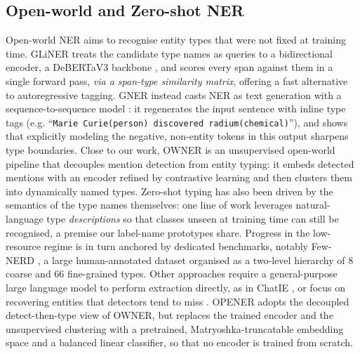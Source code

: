 \subsection{Open-world and Zero-shot NER}
\label{sec:related:openworld}
Open-world NER aims to recognise entity types that were not fixed at training time.
GLiNER \cite{zaratiana2024gliner} treats the candidate type names as queries to a bidirectional encoder, a DeBERTaV3 backbone \cite{he2023debertav3}, and scores every span against them in a single forward pass, \emph{via a span-type similarity matrix}, offering a fast alternative to autoregressive tagging.
GNER \cite{ding2024gner} instead casts NER as text generation with a sequence-to-sequence model \cite{raffel2020t5}: it regenerates the input sentence with inline type tags (e.g. ``\texttt{Marie Curie(person) discovered radium(chemical)}''), and shows that explicitly modeling the negative, non-entity tokens in this output sharpens type boundaries.
Close to our work, OWNER \cite{genest2025owner} is an unsupervised open-world pipeline that decouples mention detection from entity typing: it embeds detected mentions with an encoder refined by contrastive learning and then clusters them into dynamically named types.
Zero-shot typing has also been driven by the semantics of the type names themselves: one line of work leverages natural-language type \emph{descriptions} \cite{aly2021zeroshot} so that classes unseen at training time can still be recognised, a premise our label-name prototypes share.
Progress in the low-resource regime is in turn anchored by dedicated benchmarks, notably Few-NERD \cite{ding2021fewnerd}, a large human-annotated dataset organised as a two-level hierarchy of $8$ coarse and $66$ fine-grained types.
Other approaches require a general-purpose large language model to perform extraction directly, as in ChatIE \cite{wei2024chatie}, or focus on recovering entities that detectors tend to miss \cite{cai2025handling}.
OPENER adopts the decoupled detect-then-type view of OWNER, but replaces the trained encoder and the unsupervised clustering with a pretrained, Matryoshka-truncatable embedding space and a balanced linear classifier, so that no encoder is trained from scratch.

